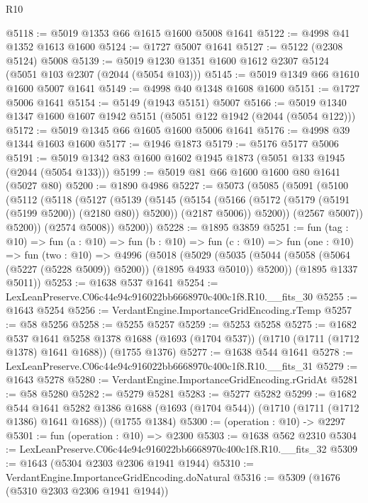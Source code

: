 \begin{lexlean}{R10}
\begin{coremodule}
@5118 := @5019 @1353 @66 @1615 @1600 @5008 @1641
@5122 := @4998 @41 @1352 @1613 @1600
@5124 := @1727 @5007 @1641
@5127 := @5122 (@2308 @5124) @5008
@5139 := @5019 @1230 @1351 @1600 @1612 @2307 @5124 (@5051 @103 @2307 (@2044 (@5054 @103)))
@5145 := @5019 @1349 @66 @1610 @1600 @5007 @1641
@5149 := @4998 @40 @1348 @1608 @1600
@5151 := @1727 @5006 @1641
@5154 := @5149 (@1943 @5151) @5007
@5166 := @5019 @1340 @1347 @1600 @1607 @1942 @5151 (@5051 @122 @1942 (@2044 (@5054 @122)))
@5172 := @5019 @1345 @66 @1605 @1600 @5006 @1641
@5176 := @4998 @39 @1344 @1603 @1600
@5177 := @1946 @1873
@5179 := @5176 @5177 @5006
@5191 := @5019 @1342 @83 @1600 @1602 @1945 @1873 (@5051 @133 @1945 (@2044 (@5054 @133)))
@5199 := @5019 @81 @66 @1600 @1600 @80 @1641 (@5027 @80)
@5200 := @1890 @4986
@5227 := @5073
    (@5085
      (@5091
        (@5100
          (@5112
            (@5118
              (@5127
                (@5139
                  (@5145
                    (@5154
                      (@5166 (@5172 (@5179 (@5191 (@5199 @5200)) (@2180 @80)) @5200))
                      (@2187 @5006))
                    @5200))
                (@2567 @5007))
              @5200))
          (@2574 @5008))
        @5200))
@5228 := @1895 @3859
@5251 := fun (tag : @10) =>
  fun (a : @10) =>
  fun (b : @10) =>
  fun (c : @10) =>
  fun (one : @10) =>
  fun (two : @10) =>
  @4996
    (@5018
      (@5029 (@5035 (@5044 (@5058 (@5064 (@5227 (@5228 @5009)) @5200)) (@1895 @4933 @5010)) @5200))
      (@1895 @1337 @5011))
@5253 := @1638 @537 @1641
@5254 := LexLeanPreserve.C06c44e94c916022bb6668970c400c1f8.R10.__fits_30
@5255 := @1643 @5254
@5256 := VerdantEngine.ImportanceGridEncoding.rTemp
@5257 := @58 @5256
@5258 := @5255 @5257
@5259 := @5253 @5258
@5275 := @1682
    @537
    @1641
    @5258
    @1378
    @1688
    (@1693 (@1704 @537))
    (@1710 (@1711 (@1712 @1378) @1641 @1688))
    (@1755 @1376)
@5277 := @1638 @544 @1641
@5278 := LexLeanPreserve.C06c44e94c916022bb6668970c400c1f8.R10.__fits_31
@5279 := @1643 @5278
@5280 := VerdantEngine.ImportanceGridEncoding.rGridAt
@5281 := @58 @5280
@5282 := @5279 @5281
@5283 := @5277 @5282
@5299 := @1682
    @544
    @1641
    @5282
    @1386
    @1688
    (@1693 (@1704 @544))
    (@1710 (@1711 (@1712 @1386) @1641 @1688))
    (@1755 @1384)
@5300 := (operation : @10) -> @2297
@5301 := fun (operation : @10) => @2300
@5303 := @1638 @562 @2310
@5304 := LexLeanPreserve.C06c44e94c916022bb6668970c400c1f8.R10.__fits_32
@5309 := @1643 (@5304 @2303 @2306 @1941 @1944)
@5310 := VerdantEngine.ImportanceGridEncoding.doNatural
@5316 := @5309 (@1676 (@5310 @2303 @2306 @1941 @1944))

\end{coremodule}
\end{lexlean}
